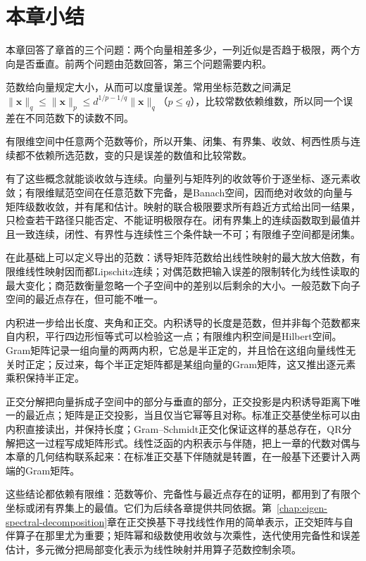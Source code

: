 \section{本章小结}
\label{sec:ls-normed-inner-product-summary}

本章回答了章首的三个问题：两个向量相差多少，一列近似是否趋于极限，两个方向是否垂直。前两个问题由范数回答，第三个问题需要内积。

范数给向量规定大小，从而可以度量误差。常用坐标范数之间满足$\lVert\bm x\rVert_q\leq\lVert\bm x\rVert_p\leq d^{1/p-1/q}\lVert\bm x\rVert_q$（$p\leq q$），比较常数依赖维数，所以同一个误差在不同范数下的读数不同。

有限维空间中任意两个范数等价，所以开集、闭集、有界集、收敛、柯西性质与连续都不依赖所选范数，变的只是误差的数值和比较常数。

有了这些概念就能谈收敛与连续。向量列与矩阵列的收敛等价于逐坐标、逐元素收敛；有限维赋范空间在任意范数下完备，是Banach空间，因而绝对收敛的向量与矩阵级数收敛，并有尾和估计。映射的联合极限要求所有趋近方式给出同一结果，只检查若干路径只能否定、不能证明极限存在。闭有界集上的连续函数取到最值并且一致连续，闭性、有界性与连续性三个条件缺一不可；有限维子空间都是闭集。

在此基础上可以定义导出的范数：诱导矩阵范数给出线性映射的最大放大倍数，有限维线性映射因而都Lipschitz连续；对偶范数把输入误差的限制转化为线性读取的最大变化；商范数衡量忽略一个子空间中的差别以后剩余的大小。一般范数下向子空间的最近点存在，但可能不唯一。

内积进一步给出长度、夹角和正交。内积诱导的长度是范数，但并非每个范数都来自内积，平行四边形恒等式可以检验这一点；有限维内积空间是Hilbert空间。Gram矩阵记录一组向量的两两内积，它总是半正定的，并且恰在这组向量线性无关时正定；反过来，每个半正定矩阵都是某组向量的Gram矩阵，这又推出逐元素乘积保持半正定。

正交分解把向量拆成子空间中的部分与垂直的部分，正交投影是内积诱导距离下唯一的最近点；矩阵是正交投影，当且仅当它幂等且对称。标准正交基使坐标可以由内积直接读出，并保持长度；Gram--Schmidt正交化保证这样的基总存在，QR分解把这一过程写成矩阵形式。线性泛函的内积表示与伴随，把上一章的代数对偶与本章的几何结构联系起来：在标准正交基下伴随就是转置，在一般基下还要计入两端的Gram矩阵。

这些结论都依赖有限维：范数等价、完备性与最近点存在的证明，都用到了有限个坐标或闭有界集上的最值。它们为后续各章提供共同依据。第~\ref{chap:eigen-spectral-decomposition}章在正交换基下寻找线性作用的简单表示，正交矩阵与自伴算子在那里尤为重要；矩阵幂和级数使用收敛与次乘性，迭代使用完备性和误差估计，多元微分把局部变化表示为线性映射并用算子范数控制余项。
